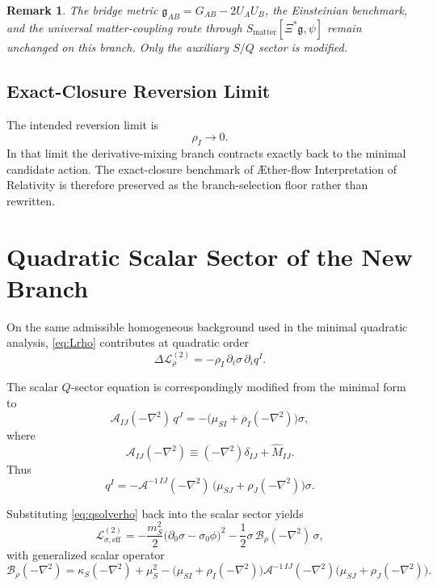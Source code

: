 \documentclass[11pt]{article}
\newcommand{\Aflow}{\AE{}ther-flow}
\newcommand{\TheoryName}{\Aflow{} Interpretation of Relativity}
\newcommand{\BridgeMetric}{\mathfrak{g}}
\newtheorem{remark}{Remark}
\begin{document}
\begin{remark}
The bridge metric \(\BridgeMetric_{AB}=G_{AB}-2U_AU_B\), the Einsteinian benchmark, and the universal matter-coupling route through \(S_{\mathrm{matter}}[\Xi^*\BridgeMetric,\psi]\) remain unchanged on this branch. Only the auxiliary \(S/Q\) sector is modified.
\end{remark}

\subsection{Exact-Closure Reversion Limit}

The intended reversion limit is
\begin{equation}
\rho_I \to 0.
\label{eq:rholimit}
\end{equation}
In that limit the derivative-mixing branch contracts exactly back to the minimal candidate action. The exact-closure benchmark of \TheoryName{} is therefore preserved as the branch-selection floor rather than rewritten.

\section{Quadratic Scalar Sector of the New Branch}

On the same admissible homogeneous background used in the minimal quadratic analysis, \eqref{eq:Lrho} contributes at quadratic order
\begin{equation}
\Delta\mathcal L_{\rho}^{(2)}
=
-\rho_I\,\partial_i\sigma\,\partial_i q^I.
\label{eq:Lrho2}
\end{equation}

The scalar \(Q\)-sector equation is correspondingly modified from the minimal form to
\begin{equation}
\mathcal A_{IJ}(-\nabla^2)\,q^J
=
-\bigl(\mu_{SI}+\rho_I(-\nabla^2)\bigr)\sigma,
\label{eq:qeqrho}
\end{equation}
where
\begin{equation}
\mathcal A_{IJ}(-\nabla^2)
\equiv
(-\nabla^2)\delta_{IJ}+\widehat M_{IJ}.
\label{eq:Aoperator}
\end{equation}
Thus
\begin{equation}
q^I
=
-\mathcal A^{-1\,IJ}(-\nabla^2)\,
\bigl(\mu_{SJ}+\rho_J(-\nabla^2)\bigr)\sigma.
\label{eq:qsolverho}
\end{equation}

Substituting \eqref{eq:qsolverho} back into the scalar sector yields
\begin{equation}
\mathcal L_{\sigma,\mathrm{eff}}^{(2)}
=
-\frac{m_S^2}{2}\bigl(\partial_0\sigma-\sigma_0\phi\bigr)^2
-\frac{1}{2}\sigma\,\mathcal B_{\rho}(-\nabla^2)\,\sigma,
\label{eq:Lsigmaeffrho}
\end{equation}
with generalized scalar operator
\begin{equation}
\mathcal B_{\rho}(-\nabla^2)
=
\kappa_S(-\nabla^2)
+\mu_S^2
-\bigl(\mu_{SI}+\rho_I(-\nabla^2)\bigr)
\mathcal A^{-1\,IJ}(-\nabla^2)
\bigl(\mu_{SJ}+\rho_J(-\nabla^2)\bigr).
\label{eq:Brhooperator}
\end{equation}
\end{document}
